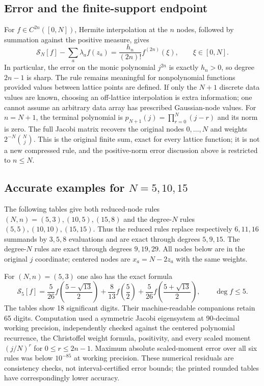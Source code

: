 \subsection{Error and the finite-support endpoint}
For $f\in C^{2n}([0,N])$, Hermite interpolation at the $n$ nodes, followed by summation against the positive measure, gives
\[
\mathcal S_N[f]-\sum_a\lambda_a f(z_a)
=\frac{h_n}{(2n)!}f^{(2n)}(\xi),\qquad \xi\in[0,N].
\]
In particular, the error on the monic polynomial $j^{2n}$ is exactly $h_n>0$, so degree $2n-1$ is sharp. The rule remains meaningful for nonpolynomial functions provided values between lattice points are defined. If only the $N+1$ discrete data values are known, choosing an off-lattice interpolation is extra information; one cannot assume an arbitrary data array has prescribed Gaussian-node values.
For $n=N+1$, the terminal polynomial is $p_{N+1}(j)=\prod_{r=0}^N(j-r)$ and its norm is zero. The full Jacobi matrix recovers the original nodes $0,\ldots,N$ and weights $2^{-N}\binom Nj$. This is the original finite sum, exact for every lattice function; it is not a new compressed rule, and the positive-norm error discussion above is restricted to $n\le N$.

\subsection{Accurate examples for $N=5,10,15$}
The following tables give both reduced-node rules $(N,n)=(5,3),(10,5),(15,8)$ and the degree-$N$ rules $(5,5),(10,10),(15,15)$. Thus the reduced rules replace respectively $6,11,16$ summands by $3,5,8$ evaluations and are exact through degrees $5,9,15$. The degree-$N$ rules are exact through degrees $9,19,29$. All nodes below are in the original $j$ coordinate; centered nodes are $x_a=N-2z_a$ with the same weights.

For $(N,n)=(5,3)$ one also has the exact formula
\[
\mathcal S_5[f]=\frac5{26}f\!\left(\frac{5-\sqrt{13}}2\right)
+\frac8{13}f\!\left(\frac52\right)
+\frac5{26}f\!\left(\frac{5+\sqrt{13}}2\right),\qquad\deg f\le5.
\]
The tables show 18 significant digits. Their machine-readable companions retain 65 digits. Computation used a symmetric Jacobi eigensystem at 90-decimal working precision, independently checked against the centered polynomial recurrence, the Christoffel weight formula, positivity, and every scaled moment $(j/N)^r$ for $0\le r\le2n-1$. Maximum absolute scaled-moment error over all six rules was below $10^{-85}$ at working precision. These numerical residuals are consistency checks, not interval-certified error bounds; the printed rounded tables have correspondingly lower accuracy.

